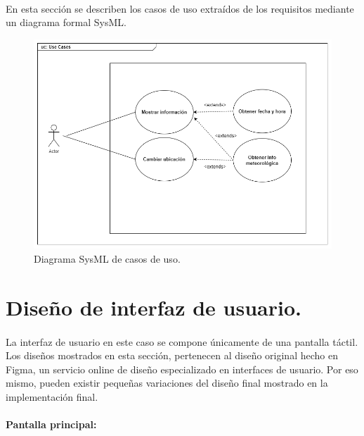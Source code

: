 \paragraph{}En esta sección se describen los casos de uso extraídos de los requisitos
mediante un diagrama formal SysML.

\begin{figure}[H]
	\centering
	\includegraphics[width=0.9\linewidth]{figs/rpi_weather-uc}
	\caption[Diagrama SysML de casos de uso]{Diagrama SysML de casos de uso.}
	\label{fig:use_cases}
\end{figure}

\section{Diseño de interfaz de usuario.}

\paragraph{}La interfaz de usuario en este caso se compone únicamente de una pantalla
táctil. Los diseños mostrados en esta sección, pertenecen al diseño original hecho en
Figma, un servicio online de diseño especializado en interfaces de usuario. Por eso mismo,
pueden existir pequeñas variaciones del diseño final mostrado en la implementación final.

\clearpage
\paragraph{}\textbf{Pantalla principal:}

